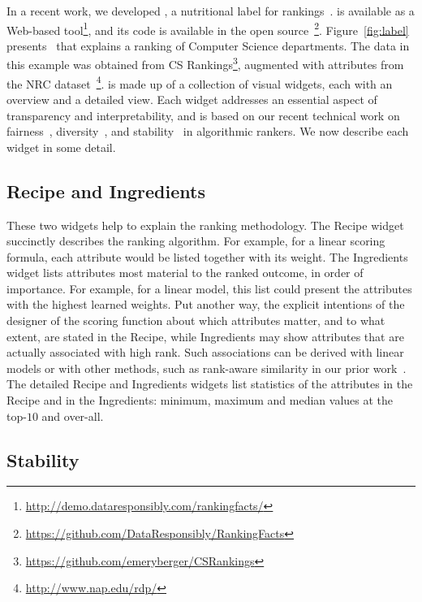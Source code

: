 In a recent work, we developed \rf, a nutritional label for rankings~\cite{DBLP:conf/sigmod/YangSAHJM18}.    \rf is available as a Web-based tool\footnote{\url{http://demo.dataresponsibly.com/rankingfacts/}}, and its code is available in the open source~\footnote{\url{https://github.com/DataResponsibly/RankingFacts}}.  Figure~\ref{fig:label} presents \rf~that explains a ranking of Computer Science departments.  The data in this example was obtained from CS Rankings\footnote{\url{https://github.com/emeryberger/CSRankings}}, augmented with attributes from the NRC dataset~\footnote{\url{http://www.nap.edu/rdp/}}.
\rf is made up of a collection of visual widgets, each with an overview and a detailed view.  Each widget addresses an essential aspect of transparency and interpretability, and is based on our recent technical work on fairness~\cite{DBLP:conf/sigmod/AsudehJS019,DBLP:conf/ssdbm/YangS17},  diversity~\cite{diversity,DBLP:conf/edbt/StoyanovichAM11,DBLP:conf/edbt/StoyanovichYJ18,DBLP:conf/ijcai/YangGS19}, and stability~\cite{DBLP:journals/pvldb/AsudehJMS18} in algorithmic rankers.   We now describe each widget in some detail.

\subsection{Recipe and Ingredients}

These two widgets help to explain the ranking methodology.  The {\sf Recipe} widget succinctly describes the ranking algorithm.  For example, for a linear scoring formula, each attribute would be listed together with its weight. The {\sf Ingredients} widget lists attributes most material to the ranked outcome, in order of importance.  For example, for a linear model, this list could present the attributes with the highest learned weights.  Put another way, the explicit intentions of the designer of the scoring function about which attributes matter, and to what extent, are stated in the {\sf Recipe}, while {\sf Ingredients} may show  attributes that are actually associated with high rank.  Such associations can be derived with linear models or with other methods, such as rank-aware similarity in our prior work~\cite{DBLP:conf/edbt/StoyanovichAM11}. The detailed {\sf Recipe} and {\sf Ingredients} widgets list statistics of the attributes in the {\sf Recipe} and in the {\sf Ingredients}: minimum, maximum and median values at the top-$10$ and over-all.

\subsection{Stability}
\label{sec:sys:stab}

